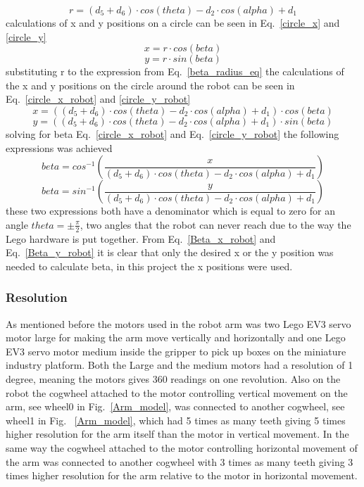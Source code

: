 \begin{equation}
    r = (d_5 + d_6)\cdot cos(theta) - d_2\cdot cos(alpha) + d_1
    \label{beta_radius_eq}
\end{equation}
calculations of x and y positions on a circle can be seen in Eq.~\eq\ref{circle_x} and \eq\ref{circle_y}
\begin{equation}
    x = r\cdot cos(beta)
    \label{circle_x}
\end{equation}
\begin{equation}
    y = r\cdot sin(beta)
    \label{circle_y}
\end{equation}
substituting r to the expression from Eq.~\eq\ref{beta_radius_eq} the calculations of the x and y positions on the circle around the robot can be seen in Eq.~\eq\ref{circle_x_robot} and \ref{circle_y_robot}
\begin{equation}
    x = ((d_5 + d_6)\cdot cos(theta) - d_2\cdot cos(alpha) + d_1)\cdot cos(beta)
    \label{circle_x_robot}
\end{equation}
\begin{equation}
    y = ((d_5 + d_6)\cdot cos(theta) - d_2\cdot cos(alpha) + d_1)\cdot sin(beta)
    \label{circle_y_robot}
\end{equation}
solving for beta Eq.~\eq\ref{circle_x_robot} and Eq.~\eq\ref{circle_y_robot} the following expressions was achieved 
\begin{equation}
    beta = cos^{-1}(\frac{x}{(d_5 + d_6)\cdot cos(theta) - d_2\cdot cos(alpha) + d_1})
    \label{Beta_x_robot}
\end{equation}
\begin{equation}
    beta = sin^{-1}(\frac{y}{(d_5 + d_6)\cdot cos(theta) - d_2\cdot cos(alpha) + d_1})
    \label{Beta_y_robot}
\end{equation}
these two expressions both have a denominator which is equal to zero for an angle \(theta = \pm \frac{\pi}{2}\), two angles that the robot can never reach due to the way the Lego hardware is put together.
From Eq.~\eq\ref{Beta_x_robot} and Eq.~\eq\ref{Beta_y_robot} it is clear that only the desired x or the y position was needed to calculate beta, in this project the x positions were used.
\subsubsection{Resolution}
As mentioned before the motors used in the robot arm was two Lego EV3 servo motor large for making the arm move vertically and horizontally and one Lego EV3 servo motor medium inside the gripper to pick up boxes on the miniature industry platform. Both the Large and the medium motors had a resolution of 1 degree, meaning the motors gives 360 readings on one revolution. Also on the robot the cogwheel attached to the motor controlling vertical movement on the arm, see wheel0 in Fig.~\ref{Arm_model}, was connected to another cogwheel, see wheel1 in Fig.
~\ref{Arm_model}, which had 5 times as many teeth giving 5 times higher resolution for the arm itself than the motor in vertical movement. In the same way the cogwheel attached to the motor controlling horizontal movement of the arm was connected to another cogwheel with 3 times as many teeth giving 3 times higher resolution for the arm relative to the motor in horizontal movement.
